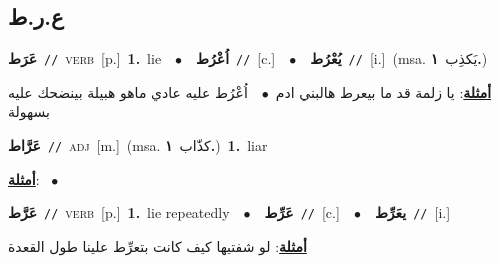 \documentclass[10pt,a4paper,twoside]{article} %
\begin{document}
\begin{multicols}{2}
\vspace{-3mm}
\subsection*{\color{blue}\foreignlanguage{arabic}{ع.ر.ط}\color{blue}{}} 

{\setlength\topsep{0pt}\textbf{\foreignlanguage{arabic}{عَرَط}}\ {\color{gray}\texttt{//}\color{black}}\ \textsc{verb}\ [p.]\ \textbf{1.}~lie\ \ $\bullet$\ \ \setlength\topsep{0pt}\textbf{\foreignlanguage{arabic}{اُعْرُط}}\ {\color{gray}\texttt{//}\color{black}}\ [c.]\ \ $\bullet$\ \ \setlength\topsep{0pt}\textbf{\foreignlanguage{arabic}{يُعْرُط}}\ {\color{gray}\texttt{//}\color{black}}\ [i.]\ \color{gray}(msa. \foreignlanguage{arabic}{يَكذِب}~\foreignlanguage{arabic}{\textbf{١.}})\color{black}\  \begin{flushright}\color{gray}\foreignlanguage{arabic}{\textbf{\underline{\foreignlanguage{arabic}{أمثلة}}}: يا زلمة قد ما بيعرط هالبني ادم\ $\bullet$\ \  اُعْرُط عليه عادي ماهو هبيلة بينضحك عليه بسهولة}\end{flushright}\color{black}} \vspace{2mm}

{\setlength\topsep{0pt}\textbf{\foreignlanguage{arabic}{عَرَّاط}}\ {\color{gray}\texttt{//}\color{black}}\ \textsc{adj}\ [m.]\ \color{gray}(msa. \foreignlanguage{arabic}{كذّاب}~\foreignlanguage{arabic}{\textbf{١.}})\color{black}\ \textbf{1.}~liar\  \begin{flushright}\color{gray}\foreignlanguage{arabic}{\textbf{\underline{\foreignlanguage{arabic}{أمثلة}}}: \ $\bullet$\ \  }\end{flushright}\color{black}} \vspace{2mm}

{\setlength\topsep{0pt}\textbf{\foreignlanguage{arabic}{عَرَّط}}\ {\color{gray}\texttt{//}\color{black}}\ \textsc{verb}\ [p.]\ \textbf{1.}~lie repeatedly\ \ $\bullet$\ \ \setlength\topsep{0pt}\textbf{\foreignlanguage{arabic}{عَرِّط}}\ {\color{gray}\texttt{//}\color{black}}\ [c.]\ \ $\bullet$\ \ \setlength\topsep{0pt}\textbf{\foreignlanguage{arabic}{يعَرِّط}}\ {\color{gray}\texttt{//}\color{black}}\ [i.]\  \begin{flushright}\color{gray}\foreignlanguage{arabic}{\textbf{\underline{\foreignlanguage{arabic}{أمثلة}}}: لو شفتيها كيف كانت بتعرِّط علينا  طول القعدة}\end{flushright}\color{black}} \vspace{2mm}


\end{multicols}
\end{document}
